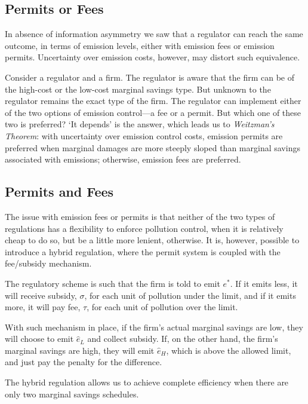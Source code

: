 \documentclass[
]{book}
\begin{document}
\hypertarget{permits-or-fees}{%
\subsection{Permits or Fees}\label{permits-or-fees}}

In absence of information asymmetry we saw that a regulator can reach the same outcome, in terms of emission levels, either with emission fees or emission permits. Uncertainty over emission costs, however, may distort such equivalence.

Consider a regulator and a firm. The regulator is aware that the firm can be of the high-cost or the low-cost marginal savings type. But unknown to the regulator remains the exact type of the firm. The regulator can implement either of the two options of emission control---a fee or a permit. But which one of these two is preferred? `It depends' is the answer, which leads us to \emph{Weitzman's Theorem}: with uncertainty over emission control costs, emission permits are preferred when marginal damages are more steeply sloped than marginal savings associated with emissions; otherwise, emission fees are preferred.

\hypertarget{permits-and-fees}{%
\subsection{Permits and Fees}\label{permits-and-fees}}

The issue with emission fees or permits is that neither of the two types of regulations has a flexibility to enforce pollution control, when it is relatively cheap to do so, but be a little more lenient, otherwise. It is, however, possible to introduce a hybrid regulation, where the permit system is coupled with the fee/subsidy mechanism.

The regulatory scheme is such that the firm is told to emit \(e^*\). If it emits less, it will receive subsidy, \(\sigma\), for each unit of pollution under the limit, and if it emits more, it will pay fee, \(\tau\), for each unit of pollution over the limit.

With such mechanism in place, if the firm's actual marginal savings are low, they will choose to emit \(\hat{e}_L\) and collect subsidy. If, on the other hand, the firm's marginal savings are high, they will emit \(\hat{e}_H\), which is above the allowed limit, and just pay the penalty for the difference.

The hybrid regulation allows us to achieve complete efficiency when there are only two marginal savings schedules.
\end{document}
